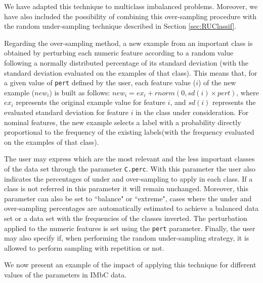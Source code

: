 \documentclass[10pt,a4paper]{article}\usepackage[]{graphicx}\usepackage[]{color}
\begin{document}
We have adapted this technique to multiclass imbalanced problems. Moreover, we have also included the possibility of combining this over-sampling procedure with the random under-sampling technique described in Section \ref{sec:RUClassif}. 

Regarding the over-sampling method, a new example from an important class is obtained by perturbing each numeric feature according to a random value following a normally distributed percentage of its standard deviation (with the standard deviation evaluated on the examples of that class). This means that, for a given value of \texttt{pert} defined by the user, each feature value ($i$) of the new example ($new_i$) is built as follows: $new_i=ex_i+rnorm(0,sd(i)\times pert) $, where $ex_i$ represents the original example value for feature $i$, and $sd(i)$ represents the evaluated standard deviation for feature $i$ in the class under consideration. For nominal features, the new example selects a label with a probability directly proportional to the frequency of the existing labels(with the frequency evaluated on the examples of that class).

The user may express which are the most relevant and the less important classes of the data set through the parameter \texttt{C.perc}. With this parameter the user also indicates the percentages of under and over-sampling to apply in each class. If a class is not referred in this parameter it will remain unchanged. Moreover, this parameter can also be set to ``balance" or ``extreme", cases where the under and over-sampling percentages are automatically estimated to achieve a balanced data set or a data set with the frequencies of the classes inverted. The perturbation applied to the numeric features is set using the \texttt{pert} parameter. Finally, the user may also specify if, when performing the random under-sampling strategy, it is allowed to perform sampling with repetition or not.

We now present an example of the impact of applying this technique for different values of the parameters in IMbC data.
\end{document}
